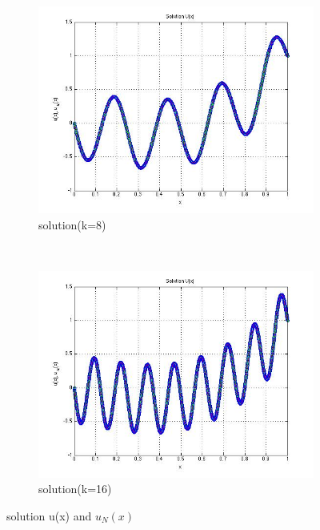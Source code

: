 \documentclass[paper=a4, fontsize=11pt]{article} %
\begin{document}
\begin{figure}
\begin{subfigure}[b]{0.45\textwidth}
        \end{subfigure}
        \begin{subfigure}[b]{0.45\textwidth}
                \includegraphics[width=\textwidth]{solutionk8.jpg}
                \caption{solution(k=8)}
                \label{fig:k8}
        \end{subfigure}
        ~ 
         \begin{subfigure}[b]{0.45\textwidth}
                \includegraphics[width=\textwidth]{solutionk16.jpg}
                \caption{solution(k=16)}
                \label{fig:k8}
        \end{subfigure}

        \caption{solution u(x) and $u_N(x)$}\label{fig:solution}
\end{figure}
\end{document}
